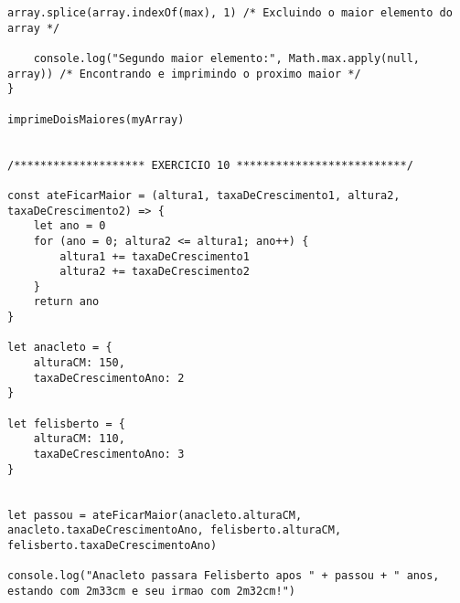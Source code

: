 \documentclass{scrreprt}
\begin{document}
\begin{lstlisting}[style=htmlcssjs]
	array.splice(array.indexOf(max), 1) /* Excluindo o maior elemento do array */ 

	console.log("Segundo maior elemento:", Math.max.apply(null, array)) /* Encontrando e imprimindo o proximo maior */ 
}

imprimeDoisMaiores(myArray)


/******************** EXERCICIO 10 **************************/

const ateFicarMaior = (altura1, taxaDeCrescimento1, altura2, taxaDeCrescimento2) => {
	let ano = 0
	for (ano = 0; altura2 <= altura1; ano++) {
		altura1 += taxaDeCrescimento1
		altura2 += taxaDeCrescimento2
	}
	return ano
}

let anacleto = {
	alturaCM: 150,
	taxaDeCrescimentoAno: 2 
}

let felisberto = {
	alturaCM: 110,
	taxaDeCrescimentoAno: 3 
}


let passou = ateFicarMaior(anacleto.alturaCM, anacleto.taxaDeCrescimentoAno, felisberto.alturaCM, felisberto.taxaDeCrescimentoAno)

console.log("Anacleto passara Felisberto apos " + passou + " anos, estando com 2m33cm e seu irmao com 2m32cm!")

\end{lstlisting}
\end{document}
